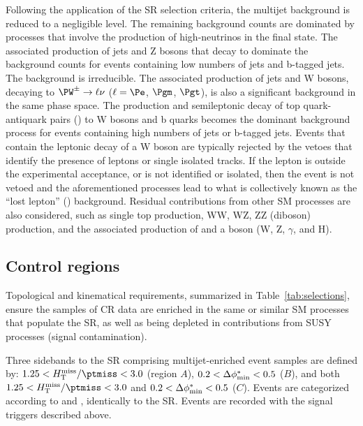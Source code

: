 Following the application of the SR selection criteria, the multijet
background is reduced to a negligible level. The remaining background
counts are dominated by processes that involve the production of
high-\pt neutrinos in the final state. The associated production of
jets and Z bosons that decay to \znunu dominate the background counts
for events containing low numbers of jets and b-tagged jets. The
\znunuj background is irreducible. The associated production of jets
and W bosons, decaying to $\PW^\pm \to \ell\nu$ ($\ell=\Pe$, $\Pgm$,
$\Pgt$), is also a significant background in the same phase space. The
production and semileptonic decay of top quark-antiquark pairs
(\ttbar) to W bosons and b quarks becomes the dominant background
process for events containing high numbers of jets or b-tagged
jets. Events that contain the leptonic decay of a W boson are
typically rejected by the vetoes that identify the presence of leptons
or single isolated tracks. If the lepton is outside the experimental
acceptance, or is not identified or isolated, then the event is not
vetoed and the aforementioned processes lead to what is collectively
known as the ``lost lepton'' (\lost) background. Residual
contributions from other SM processes are also considered, such as
single top production, WW, WZ, ZZ (diboson) production, and the
associated production of \ttbar and a boson ({\ttbar}W, {\ttbar}Z,
{\ttbar}$\gamma$, and {\ttbar}H).


\subsection{Control regions}
\label{sec:control}

Topological and kinematical requirements, summarized in
Table~\ref{tab:selections}, ensure the samples of CR data are enriched
in the same or similar SM processes that populate the SR, as well as
being depleted in contributions from SUSY processes (signal
contamination).

Three sidebands to the SR comprising multijet-enriched event samples
are defined by: $1.25 < \mhtmet < 3.0$ (region $A$), $0.2 < \bdphi <
0.5$ ($B$), and both $1.25 < \mhtmet < 3.0$ and $0.2 < \bdphi < 0.5$
($C$). Events are categorized according to \njet and \scalht,
identically to the SR. Events are recorded with the signal triggers
described above.

